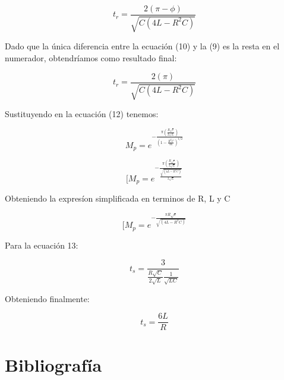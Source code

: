 \documentclass[12pt, letterpaper]{article}
\begin{document}
\begin{center}
    \begin{tcolorbox}[colframe=red!80!black, width=8cm, sharp corners]
        \[t_r = \frac{2(\pi-\phi)}{\sqrt{C(4L-R^2C)}}\]
    \end{tcolorbox}
\end{center}

Dado que la única diferencia entre la ecuación (10) y la (9) es la resta en el numerador, obtendríamos como resultado final:

\begin{center}
    \begin{tcolorbox}[colframe=red!80!black, width=8cm, sharp corners]
        \[t_r = \frac{2(\pi)}{\sqrt{C(4L-R^2C)}}\]
    \end{tcolorbox}
\end{center}

Sustituyendo en la ecuación (12) tenemos:

\[M_p = e^{- \frac{\pi (\frac{R\sqrt{c}}{2\sqrt{L}})}{(1-\frac{R^2C}{4L})^{1/2}}}\]

\[[M_p = e^{- \frac{\pi (\frac{R\sqrt{c}}{2\sqrt{L}})}{\frac{\sqrt{(4L - R^2C)}}{2\sqrt{L}}}}\]

Obteniendo la expresíon simplificada en terminos de R, L y C

\begin{center}
    \begin{tcolorbox}[colframe=red!80!black, width=8cm, sharp corners]
        \[[M_p = e^{- \frac{\pi R\sqrt{c}}{\sqrt{(4L - R^2C)}}}\]
    \end{tcolorbox}
\end{center}

Para la ecuación 13:

\[t_s = \frac{3}{\frac{R\sqrt{C}}{2\sqrt{L}}\frac{1}{\sqrt{LC}}}\]

Obteniendo finalmente:

\begin{center}
    \begin{tcolorbox}[colframe=red!80!black, width=8cm, sharp corners]
        \[t_s = \frac{6L}{R}\]
    \end{tcolorbox}
\end{center}

\section*{Bibliografía}
\end{document}
